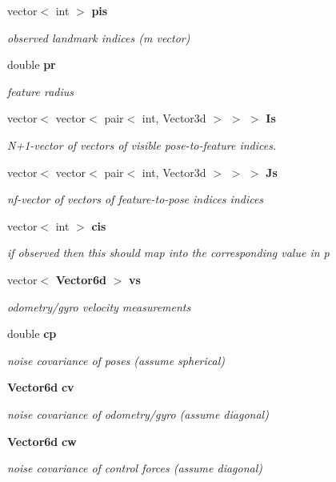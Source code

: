 \begin{DoxyCompactItemize}
vector$<$ int $>$ {\bf pis}
\begin{DoxyCompactList}\small\item\em observed landmark indices (m vector) \end{DoxyCompactList}\item 
double {\bf pr}
\begin{DoxyCompactList}\small\item\em feature radius \end{DoxyCompactList}\item 
vector$<$ vector$<$ pair$<$ int, \*
\-Vector3d $>$ $>$ $>$ {\bf \-Is}
\begin{DoxyCompactList}\small\item\em \-N+1-\/vector of vectors of visible pose-\/to-\/feature indices. \end{DoxyCompactList}\item 
vector$<$ vector$<$ pair$<$ int, \*
\-Vector3d $>$ $>$ $>$ {\bf \-Js}
\begin{DoxyCompactList}\small\item\em nf-\/vector of vectors of feature-\/to-\/pose indices indices \end{DoxyCompactList}\item 
vector$<$ int $>$ {\bf cis}
\begin{DoxyCompactList}\small\item\em if observed then this should map into the corresponding value in p \end{DoxyCompactList}\item 
vector$<$ {\bf \-Vector6d} $>$ {\bf vs}
\begin{DoxyCompactList}\small\item\em odometry/gyro velocity measurements \end{DoxyCompactList}\item 
double {\bf cp}
\begin{DoxyCompactList}\small\item\em noise covariance of poses (assume spherical) \end{DoxyCompactList}\item 
{\bf \-Vector6d} {\bf cv}
\begin{DoxyCompactList}\small\item\em noise covariance of odometry/gyro (assume diagonal) \end{DoxyCompactList}\item 
{\bf \-Vector6d} {\bf cw}
\begin{DoxyCompactList}\small\item\em noise covariance of control forces (assume diagonal) \end{DoxyCompactList}\end{DoxyCompactItemize}



